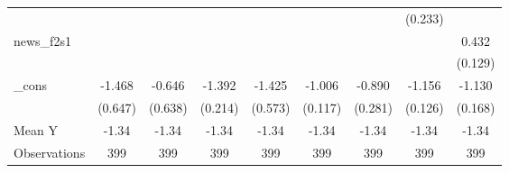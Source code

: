 {\begin{tabular}{l*{8}{c}}
            &                     &                     &                     &                     &                     &                     &     (0.233)         &                     \\
\addlinespace
news\_f2s1   &                     &                     &                     &                     &                     &                     &                     &       0.432\sym{***}\\
            &                     &                     &                     &                     &                     &                     &                     &     (0.129)         \\
\addlinespace
\_cons      &      -1.468\sym{**} &      -0.646         &      -1.392\sym{***}&      -1.425\sym{**} &      -1.006\sym{***}&      -0.890\sym{***}&      -1.156\sym{***}&      -1.130\sym{***}\\
            &     (0.647)         &     (0.638)         &     (0.214)         &     (0.573)         &     (0.117)         &     (0.281)         &     (0.126)         &     (0.168)         \\
\midrule
Mean Y      &       -1.34         &       -1.34         &       -1.34         &       -1.34         &       -1.34         &       -1.34         &       -1.34         &       -1.34         \\
Observations&         399         &         399         &         399         &         399         &         399         &         399         &         399         &         399         \\
\bottomrule
\end{tabular}
}
